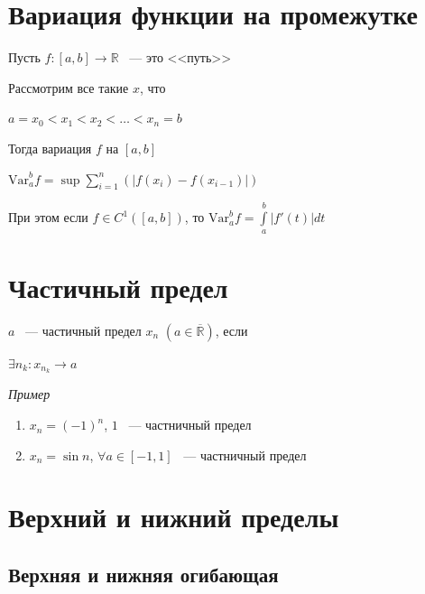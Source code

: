 \documentclass{article}
\begin{document}
    \newpage
    
    \section{Вариация функции на промежутке}
    
        Пусть $f: [a, b] \rightarrow \mathbb{R}$ ~--- это <<путь>>
        
        Рассмотрим все такие $x$, что
        
        $a = x_0 < x_1 < x_2 < \ldots < x_n = b$
        
        Тогда вариация $f$ на $[a, b]$
        
        $\mathrm{Var}^b_a f = \sup \sum\limits^n_{i = 1} \left( \left| f(x_i) - f(x_{i - 1}) \right| \right)$
        
        При этом если $f \in C^1 \left([a, b]\right)$, то $\mathrm{Var}^b_a f = \int\limits^b_a |f'(t)| dt$
        
    \newpage
    
    \section{Частичный предел}
    
        $a$ ~--- частичный предел $x_n$ $(a \in \overline{\mathbb{R}})$, если
        
        $\exists n_k : x_{n_k} \rightarrow a$
        
        \textit{Пример}
        
        \begin{enumerate}
        
            \item $x_n = (-1)^n$, $1$ ~--- частничный предел
            
            \item $x_n = \sin{n}$, $\forall a \in [-1, 1]$ ~--- частничный предел
            
        \end{enumerate}
        
    \newpage
    
    \section{Верхний и нижний пределы}
    
        \subsection{Верхняя и нижняя огибающая}
        
\end{document}
